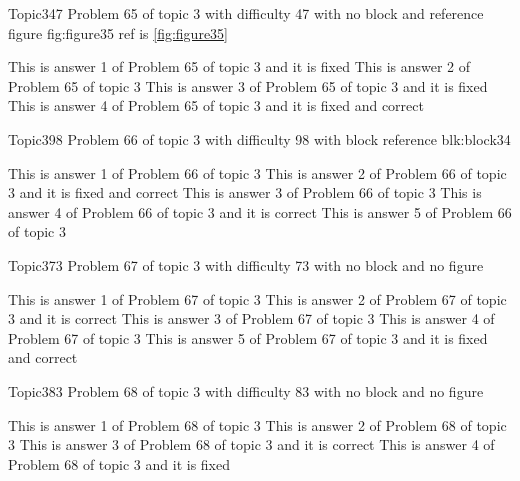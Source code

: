 \documentclass[master]{exam}
\begin{document}
\begin{problem}{Topic3}{47}
	Problem 65 of topic 3 with difficulty 47 with no block and reference figure fig:figure35 ref is \ref{fig:figure35}
	\begin{answers}
		\answer[fixed] This is answer 1 of Problem 65 of topic 3 and it is fixed
		\answer This is answer 2 of Problem 65 of topic 3 
		\answer[fixed] This is answer 3 of Problem 65 of topic 3 and it is fixed
		 This is answer 4 of Problem 65 of topic 3 and it is fixed and correct
	\end{answers}
\end{problem}

\begin{problem}[requires=blk:block34]{Topic3}{98}
	Problem 66 of topic 3 with difficulty 98 with block reference blk:block34
	\begin{answers}
		\answer This is answer 1 of Problem 66 of topic 3 
		 This is answer 2 of Problem 66 of topic 3 and it is fixed and correct
		\answer This is answer 3 of Problem 66 of topic 3 
		\answer[correct] This is answer 4 of Problem 66 of topic 3 and it is correct
		\answer This is answer 5 of Problem 66 of topic 3 
	\end{answers}
\end{problem}

\begin{problem}{Topic3}{73}
	Problem 67 of topic 3 with difficulty 73 with no block and no figure
	\begin{answers}
		\answer This is answer 1 of Problem 67 of topic 3 
		\answer[correct] This is answer 2 of Problem 67 of topic 3 and it is correct
		\answer This is answer 3 of Problem 67 of topic 3 
		\answer This is answer 4 of Problem 67 of topic 3 
		 This is answer 5 of Problem 67 of topic 3 and it is fixed and correct
	\end{answers}
\end{problem}

\begin{problem}{Topic3}{83}
	Problem 68 of topic 3 with difficulty 83 with no block and no figure
	\begin{answers}
		\answer This is answer 1 of Problem 68 of topic 3 
		\answer This is answer 2 of Problem 68 of topic 3 
		\answer[correct] This is answer 3 of Problem 68 of topic 3 and it is correct
		\answer[fixed] This is answer 4 of Problem 68 of topic 3 and it is fixed
	\end{answers}
\end{problem}
\end{document}
